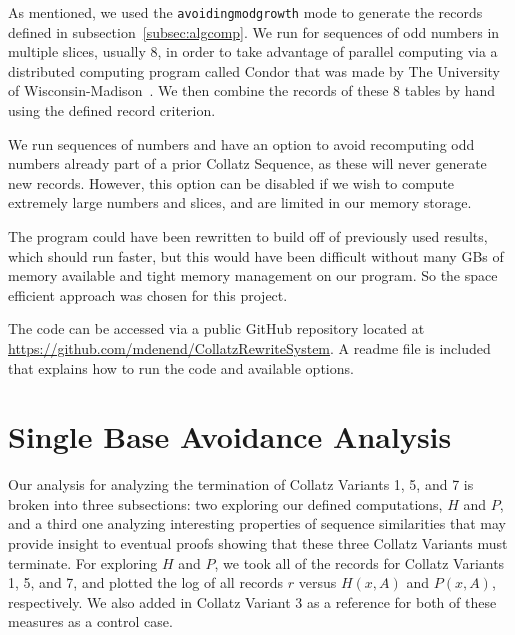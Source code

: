 As mentioned, we used the {\tt avoidingmodgrowth} mode to generate the records defined in subsection~\ref{subsec:algcomp}. We run for sequences of odd numbers in multiple slices, usually 8, in order to take advantage of parallel computing via a distributed computing program called Condor that was made by The University of Wisconsin-Madison~\cite{Thain:2005:DCP:1064323.1064336}. We then combine the records of these 8 tables by hand using the defined record criterion. \par
We run sequences of numbers and have an option to avoid recomputing odd numbers already part of a prior Collatz Sequence, as these will never generate new records. However, this option can be disabled if we wish to compute extremely large numbers and slices, and are limited in our memory storage. \par
The program could have been rewritten to build off of previously used results, which should run faster, but this would have been difficult without many GBs of memory available and tight memory management on our program. So the space efficient approach was chosen for this project.\par
The code can be accessed via a public GitHub repository located at \url{https://github.com/mdenend/CollatzRewriteSystem}. A readme file is included that explains how to run the code and available options.
\section{Single Base Avoidance Analysis} \label{subsec:algsinglebase}
Our analysis for analyzing the termination of Collatz Variants 1, 5, and 7 is broken into three subsections: two exploring our defined computations, $H$ and $P$, and a third one analyzing interesting properties of sequence similarities that may provide insight to eventual proofs showing that these three Collatz Variants must terminate.
For exploring $H$ and $P$, we took all of the records for Collatz Variants 1, 5, and 7, and plotted the log of all records $r$ versus $H(x,A)$ and $P(x,A)$, respectively. We also added in Collatz Variant 3 as a reference for both of these measures as a control case.
